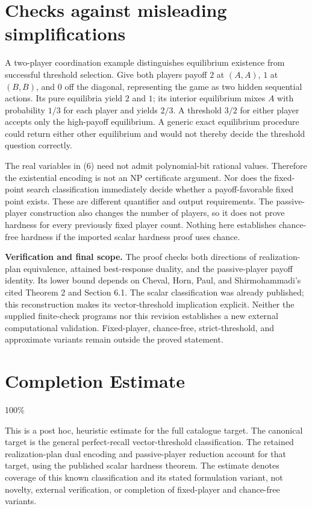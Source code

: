 \documentclass[11pt]{article}
\begin{document}
\section*{Checks against misleading simplifications}
A two-player coordination example distinguishes equilibrium existence
from successful threshold selection. Give both players payoff $2$ at
$(A,A)$, $1$ at $(B,B)$, and $0$ off the diagonal, representing the game
as two hidden sequential actions. Its pure equilibria yield $2$ and $1$;
its interior equilibrium mixes $A$ with probability $1/3$ for each player
and yields $2/3$. A threshold $3/2$ for either player accepts only the
high-payoff equilibrium. A generic exact equilibrium procedure could
return either other equilibrium and would not thereby decide the
threshold question correctly.

The real variables in (6) need not admit polynomial-bit rational values.
Therefore the existential encoding is not an NP certificate argument.
Nor does the fixed-point search classification immediately decide whether
a payoff-favorable fixed point exists. These are different quantifier
and output requirements. The passive-player construction also changes
the number of players, so it does not prove hardness for every previously
fixed player count. Nothing here establishes chance-free hardness if
the imported scalar hardness proof uses chance.

\textbf{Verification and final scope.} The proof checks both directions
of realization-plan equivalence, attained best-response duality, and the
passive-player payoff identity. Its lower bound depends on Cheval, Horn,
Paul, and Shirmohammadi's cited Theorem 2 and Section 6.1. The scalar
classification was already published; this reconstruction makes its
vector-threshold implication explicit. Neither the supplied finite-check
programs nor this revision establishes a new external computational
validation. Fixed-player, chance-free, strict-threshold, and approximate
variants remain outside the proved statement.

\section{Completion Estimate}
100\%

This is a post hoc, heuristic estimate for the full catalogue target.
The canonical target is the general perfect-recall vector-threshold
classification. The retained realization-plan dual encoding and
passive-player reduction account for that target, using the published
scalar hardness theorem. The estimate denotes coverage of this known
classification and its stated formulation variant, not novelty, external
verification, or completion of fixed-player and chance-free variants.
\end{document}

